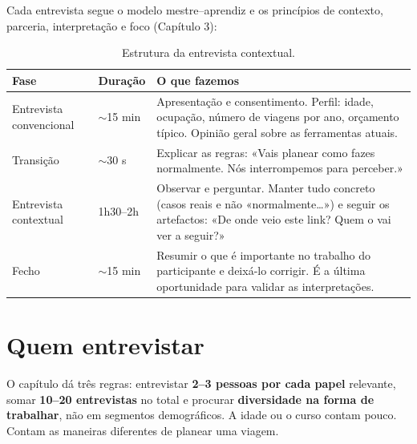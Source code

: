 \documentclass[11pt,a4paper]{article}
\begin{document}
Cada entrevista segue o modelo mestre--aprendiz e os princípios de contexto, parceria, interpretação e foco (Capítulo 3):

\begin{table}[h]
\centering
\begin{tabularx}{\textwidth}{@{}p{3.6cm}p{1.8cm}L@{}}
\toprule
\textbf{Fase} & \textbf{Duração} & \textbf{O que fazemos} \\
\midrule
Entrevista convencional & $\sim$15 min & Apresentação e consentimento. Perfil: idade, ocupação, número de viagens por ano, orçamento típico. Opinião geral sobre as ferramentas atuais. \\
Transição & $\sim$30 s & Explicar as regras: «Vais planear como fazes normalmente. Nós interrompemos para perceber.» \\
Entrevista contextual & 1h30--2h & Observar e perguntar. Manter tudo concreto (casos reais e não «normalmente\ldots») e seguir os artefactos: «De onde veio este link? Quem o vai ver a seguir?» \\
Fecho & $\sim$15 min & Resumir o que é importante no trabalho do participante e deixá-lo corrigir. É a última oportunidade para validar as interpretações. \\
\bottomrule
\end{tabularx}
\caption{Estrutura da entrevista contextual.}
\end{table}

\section{Quem entrevistar}

O capítulo dá três regras: entrevistar \textbf{2--3 pessoas por cada papel} relevante, somar \textbf{10--20 entrevistas} no total e procurar \textbf{diversidade na forma de trabalhar}, não em segmentos demográficos. A idade ou o curso contam pouco. Contam as maneiras diferentes de planear uma viagem.
\end{document}

